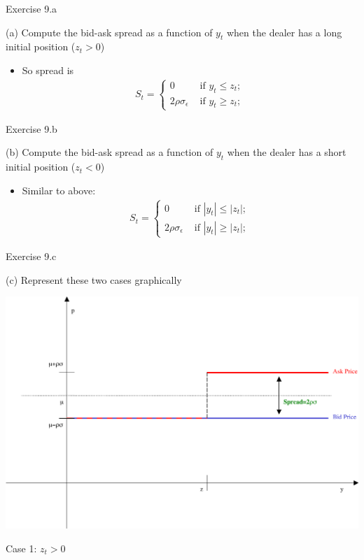 \documentclass[english,10pt]{beamer}
\begin{document}
\begin{frame}{Exercise 9.a}
	\begin{exampleblock}{}
		(a) Compute the bid-ask spread as a function of $y_t$ when the dealer has a long initial position ($z_t > 0$)
	\end{exampleblock}
	\begin{itemize}
		\item So spread is
		\begin{align*}
			S_t = 
			\begin{cases}
				0 & \text{ if } y_t \leq z_t;
				\\
				2\rho\sigma_{\epsilon} & \text{ if } y_t \geq z_t;
			\end{cases}
		\end{align*}
	\end{itemize}
\end{frame}


\begin{frame}{Exercise 9.b}
\begin{exampleblock}{}
	(b) Compute the bid-ask spread as a function of $y_t$ when the dealer has a short initial position ($z_t < 0$)
\end{exampleblock}
\begin{itemize}
	\item Similar to above:
	\begin{align*}
		S_t = 
		\begin{cases}
		0 & \text{ if } |y_t| \leq |z_t|;
		\\
		2\rho\sigma_{\epsilon} & \text{ if } |y_t| \geq |z_t|;
		\end{cases}
	\end{align*}
\end{itemize}
\end{frame}


\begin{frame}{Exercise 9.c}
	\begin{exampleblock}{}
		(c) Represent these two cases graphically
	\end{exampleblock}
	\centering
	\includegraphics[scale=0.2]{pics/ex9c_1}
	
	Case 1: $z_t > 0$
\end{frame}
\end{document}
